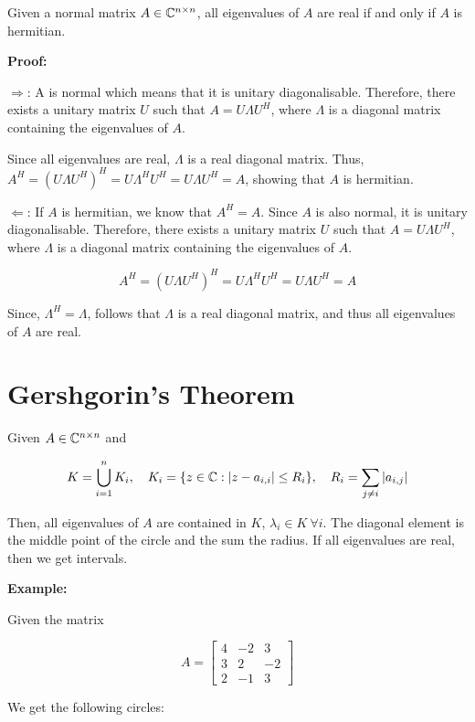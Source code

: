 Given a normal matrix \(A \in \mathbb{C}^{n \times n}\), all eigenvalues of \(A\) are real if and only if \(A\) is hermitian.

\textbf{Proof:}

\(\Rightarrow\): A is normal which means that it is unitary diagonalisable. Therefore, there exists a unitary matrix \(U\) 
such that \(A = U \Lambda U^H\), where \(\Lambda\) is a diagonal matrix containing the eigenvalues of \(A\). 

Since all eigenvalues are real, \(\Lambda\) is a real diagonal matrix. Thus, 
\(A^H = (U \Lambda U^H)^H = U \Lambda^H U^H = U \Lambda U^H = A\), showing that \(A\) is hermitian.

\(\Leftarrow\): If \(A\) is hermitian, we know that \(A^H = A\). Since \(A\) is also normal, it is unitary diagonalisable. 
Therefore, there exists a unitary matrix \(U\) such that \(A = U \Lambda U^H\), where \(\Lambda\) is a diagonal matrix containing the eigenvalues of \(A\).

\[
    A^H = (U \Lambda U^H)^H = U \Lambda^H U^H = U \Lambda U^H = A
\] 

Since, \(\Lambda^H = \Lambda\), follows that \(\Lambda\) is a real diagonal matrix, and thus all eigenvalues of \(A\) are real.

\QED

\section{Gershgorin's Theorem}

Given \(A \in \mathbb{C}^{n \times n}\) and 

\[
    K = \bigcup_{i=1}^n K_i, \quad K_i = \{ z \in \mathbb{C} : |z - a_{i,i}| \leq R_i\}, \quad R_i = \sum_{j \ne i} |a_{i,j}|
\]

Then, all eigenvalues of \(A\) are contained in \(K\), \(\lambda_i \in K \ \forall i\). The diagonal element is the middle point 
of the circle and the sum the radius. If all eigenvalues are real, then we get intervals.

\textbf{Example:}

Given the matrix 

\[
    A = 
    \begin{bmatrix}
       4 & -2 & 3 \\
       3 & 2 & -2 \\ 
       2 & -1 & 3 
    \end{bmatrix}
\]

We get the following circles:

